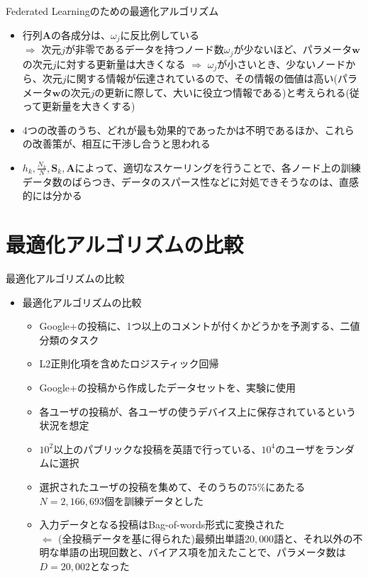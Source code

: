 \documentclass[dvipdfmx,notheorems,t]{beamer}
\begin{document}
\begin{frame}{Federated Learningのための最適化アルゴリズム}
\begin{enumerate}
\begin{itemize}
		\item 行列$\bm{A}$の各成分は、$\omega_j$に反比例している \\
		$\Rightarrow$ 次元$j$が非零であるデータを持つノード数$\omega_j$が少ないほど、パラメータ$\bm{w}$の次元$j$に対する更新量は大きくなる \newline \newline
		$\Rightarrow$ $\omega_j$が小さいとき、少ないノードから、次元$j$に関する情報が伝達されているので、その情報の価値は高い(パラメータ$\bm{w}$の次元$j$の更新に際して、大いに役立つ情報である)と考えられる(従って更新量を大きくする)
		\newline
		
		\item 4つの改善のうち、どれが最も効果的であったかは不明であるほか、これらの改善策が、相互に干渉し合うと思われる
		\item $h_k, \frac{N_k}{N}, \bm{S}_k, \bm{A}$によって、適切なスケーリングを行うことで、各ノード上の訓練データ数のばらつき、データのスパース性などに対処できそうなのは、直感的には分かる
	\end{itemize}
\end{enumerate}

\end{frame}

\section{最適化アルゴリズムの比較}

\begin{frame}{最適化アルゴリズムの比較}

\begin{itemize}
	\item 最適化アルゴリズムの比較
	\begin{itemize}
		\item Google+の投稿に、1つ以上のコメントが付くかどうかを予測する、二値分類のタスク
		\item L2正則化項を含めたロジスティック回帰
		\newline
		
		\item Google+の投稿から作成したデータセットを、実験に使用
		\item 各ユーザの投稿が、各ユーザの使うデバイス上に保存されているという状況を想定
		\item $10^2$以上のパブリックな投稿を英語で行っている、$10^4$のユーザをランダムに選択
		\item 選択されたユーザの投稿を集めて、そのうちの$75\%$にあたる$N = 2,166,693$個を訓練データとした
		\newline
		
		\item 入力データとなる投稿はBag-of-words形式に変換された \\
		$\Leftarrow$ (全投稿データを基に得られた)最頻出単語$20,000$語と、それ以外の不明な単語の出現回数と、バイアス項を加えたことで、パラメータ数は$D = 20,002$となった
	\end{itemize}
\end{itemize}

\end{frame}
\end{document}

